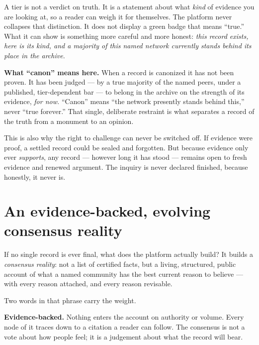 \documentclass[11pt,a4paper]{article}
\begin{document}
A tier is not a verdict on truth. It is a statement about what \emph{kind}
of evidence you are looking at, so a reader can weigh it for themselves. The
platform never collapses that distinction. It does not display a green badge
that means ``true.'' What it can show is something more careful and more
honest: \emph{this record exists, here is its kind, and a majority of this
named network currently stands behind its place in the archive.}

\begin{notebox}
\textbf{What ``canon'' means here.} When a record is canonized it has not
been proven. It has been judged --- by a true majority of the named peers,
under a published, tier-dependent bar --- to belong in the archive on the
strength of its evidence, \emph{for now.} ``Canon'' means ``the network
presently stands behind this,'' never ``true forever.'' That single,
deliberate restraint is what separates a record of the truth from a monument
to an opinion.
\end{notebox}

This is also why the right to challenge can never be switched off. If
evidence were proof, a settled record could be sealed and forgotten. But
because evidence only ever \emph{supports}, any record --- however long it
has stood --- remains open to fresh evidence and renewed argument. The
inquiry is never declared finished, because honestly, it never is.

\section{An evidence-backed, evolving consensus reality}

If no single record is ever final, what does the platform actually build?
It builds a \emph{consensus reality}: not a list of certified facts, but a
living, structured, public account of what a named community has the best
current reason to believe --- with every reason attached, and every reason
revisable.

Two words in that phrase carry the weight.

\textbf{Evidence-backed.} Nothing enters the account on authority or
volume. Every node of it traces down to a citation a reader can follow. The
consensus is not a vote about how people feel; it is a judgement about what
the record will bear.
\end{document}
